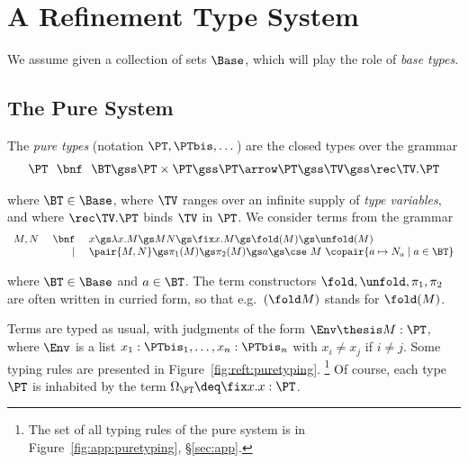 \section{A Refinement Type System}
\label{sec:system}


\noindent
We assume given a collection of sets $\Base$,
which will play the role of \emph{base types}.

\subsection{The Pure System}
\label{sec:pure}

The \emph{pure types}
(notation $\PT,\PTbis,\dots$) are
the closed types over the grammar
\begin{equation*}
\begin{array}{r @{\ \ }c@{\ \ } l}
     \PT
&    \bnf
&    \BT
\gss \PT \times \PT
\gss \PT \arrow \PT
\gss \TV
\gss \rec \TV.\PT 
\end{array}
\end{equation*}

\noindent
where $\BT \in \Base$,
where $\TV$ ranges over an infinite supply of \emph{type variables},
and where $\rec\TV.\PT$ binds $\TV$ in $\PT$.
%
We consider terms from the grammar
\[
\begin{array}{r !{~}r!{~} l}
    M,N 
&   \bnf
&   x
\gs \lambda x.M
\gs M N
\gs \fix x.M
\gs \fold(M)
\gs \unfold(M)
\\

&   \mid
&   \pair{M,N}
\gs \pi_1(M)
\gs \pi_2(M)
\gs a
\gs \cse\ M\ \copair{a \mapsto N_a \mid a \in \BT}
\end{array}
\]

\noindent
where $\BT \in \Base$ and $a \in \BT$.
The term constructors $\fold, \unfold, \pi_1, \pi_2$
are often written in curried form,
so that e.g.\ $(\fold M)$ stands for $\fold(M)$.


Terms are typed as usual, with judgments of the form
$\Env \thesis M : \PT$, where $\Env$ is a list
$x_1:\PTbis_1,\dots,x_n:\PTbis_n$ with $x_i \neq x_j$
if $i \neq j$.
Some typing rules are presented in Figure~\ref{fig:reft:puretyping}.%
\footnote{The set of all typing rules of the pure system is in
Figure~\ref{fig:app:puretyping}, \S\ref{sec:app}.}
Of course, each type $\PT$ is inhabited
by the term $\Omega_\PT \deq \fix x.x : \PT$.


